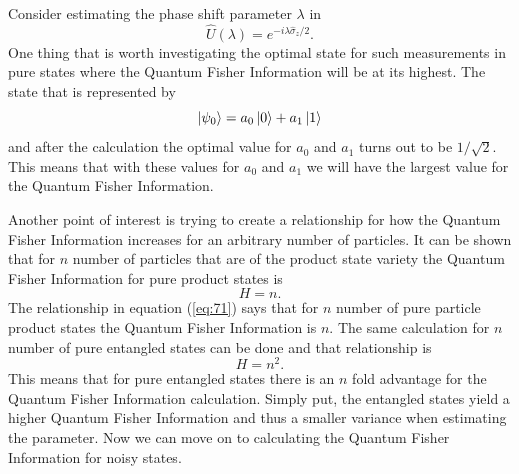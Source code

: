 \documentclass[twocolumn]{article}
\begin{document}
Consider estimating the phase shift parameter $\lambda$ in
\begin{equation} \label{eq:69}
\hat{U}(\lambda)=e^{-i\lambda\hat{\sigma}_z/2}.
\end{equation}
One thing that is worth investigating the optimal state for such measurements in pure states where the Quantum Fisher Information will be at its highest. The state that is represented by
\begin{equation} \label{eq:70}
\ket{\psi_0}=a_0\ket{0}+a_1\ket{1}
\end{equation}
and after the calculation the optimal value for $a_0$ and $a_1$ turns out to be $1/\sqrt{2}$. This means that with these values for $a_0$ and $a_1$ we will have the largest value for the Quantum Fisher Information.

Another point of interest is trying to create a relationship for how the Quantum Fisher Information increases for an arbitrary number of particles. It can be shown that for $n$ number of particles that are of the product state variety the Quantum Fisher Information for pure product states is
\begin{equation} \label{eq:71}
H=n.
\end{equation}
The relationship in equation (\ref{eq:71}) says that for $n$ number of pure particle product states the Quantum Fisher Information is $n$. The same calculation for $n$ number of pure entangled states can be done and that relationship is
\begin{equation} \label{eq:72}
H=n^2.
\end{equation}
This means that for pure entangled states there is an $n$ fold advantage for the Quantum Fisher Information calculation. Simply put, the entangled states yield a higher Quantum Fisher Information and thus a smaller variance when estimating the parameter. Now we can move on to calculating the Quantum Fisher Information for noisy states.
\end{document}
